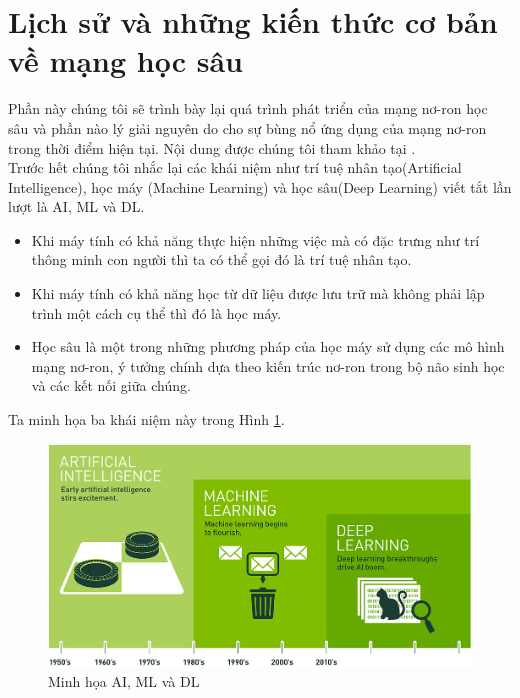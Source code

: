 \section{Lịch sử và những kiến thức cơ bản về mạng học sâu}
Phần này chúng tôi sẽ trình bày lại quá trình phát triển của mạng nơ-ron học sâu và phần nào lý giải nguyên do cho sự bùng nổ ứng dụng của mạng nơ-ron trong thời điểm hiện tại. Nội dung được chúng tôi tham khảo tại \cite{basicdeep}.\\
Trước hết chúng tôi nhắc lại các khái niệm như trí tuệ nhân tạo(Artificial Intelligence), học máy (Machine Learning) và học sâu(Deep Learning) viết tắt lần lượt là AI, ML và DL.
\begin{itemize}
    \item Khi máy tính có khả năng thực hiện những việc mà có đặc trưng như trí thông minh con người thì ta có thể gọi đó là trí tuệ nhân tạo.
    \item Khi máy tính có khả năng học từ dữ liệu được lưu trữ mà không phải lập trình một cách cụ thể thì đó là học máy.
    \item Học sâu là một trong những phương pháp của học máy sử dụng các mô hình mạng nơ-ron, ý tưởng chính dựa theo kiến trúc nơ-ron trong bộ não sinh học và các kết nối giữa chúng.
\end{itemize}
 Ta minh họa ba khái niệm này trong Hình \ref{history}.

\begin{figure}[ht]
\centering
        \includegraphics[totalheight=8cm]{Images/history.png}
    \caption{Minh họa AI, ML và DL\cite{basicai}}
    \label{history}
\end{figure}

